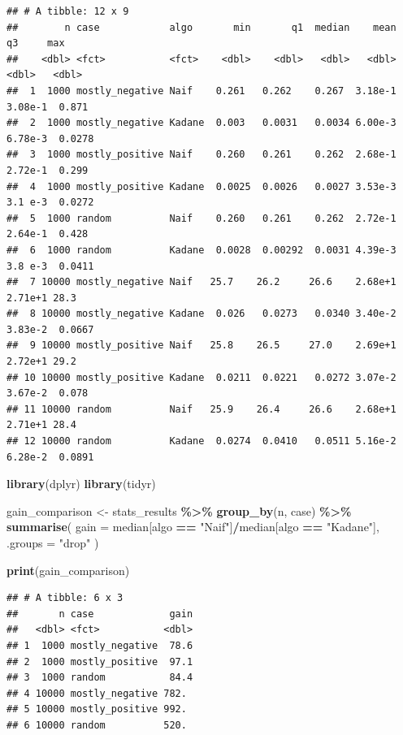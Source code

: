 \documentclass[
]{article}
\newenvironment{Shaded}{\begin{snugshade}}{\end{snugshade}}
\newcommand{\AttributeTok}[1]{\textcolor[rgb]{0.13,0.29,0.53}{#1}}
\newcommand{\FunctionTok}[1]{\textcolor[rgb]{0.13,0.29,0.53}{\textbf{#1}}}
\newcommand{\NormalTok}[1]{#1}
\newcommand{\OtherTok}[1]{\textcolor[rgb]{0.56,0.35,0.01}{#1}}
\newcommand{\SpecialCharTok}[1]{\textcolor[rgb]{0.81,0.36,0.00}{\textbf{#1}}}
\newcommand{\StringTok}[1]{\textcolor[rgb]{0.31,0.60,0.02}{#1}}
\begin{document}
\begin{verbatim}
## # A tibble: 12 x 9
##        n case            algo       min       q1  median    mean      q3     max
##    <dbl> <fct>           <fct>    <dbl>    <dbl>   <dbl>   <dbl>   <dbl>   <dbl>
##  1  1000 mostly_negative Naif    0.261   0.262    0.267  3.18e-1 3.08e-1  0.871 
##  2  1000 mostly_negative Kadane  0.003   0.0031   0.0034 6.00e-3 6.78e-3  0.0278
##  3  1000 mostly_positive Naif    0.260   0.261    0.262  2.68e-1 2.72e-1  0.299 
##  4  1000 mostly_positive Kadane  0.0025  0.0026   0.0027 3.53e-3 3.1 e-3  0.0272
##  5  1000 random          Naif    0.260   0.261    0.262  2.72e-1 2.64e-1  0.428 
##  6  1000 random          Kadane  0.0028  0.00292  0.0031 4.39e-3 3.8 e-3  0.0411
##  7 10000 mostly_negative Naif   25.7    26.2     26.6    2.68e+1 2.71e+1 28.3   
##  8 10000 mostly_negative Kadane  0.026   0.0273   0.0340 3.40e-2 3.83e-2  0.0667
##  9 10000 mostly_positive Naif   25.8    26.5     27.0    2.69e+1 2.72e+1 29.2   
## 10 10000 mostly_positive Kadane  0.0211  0.0221   0.0272 3.07e-2 3.67e-2  0.078 
## 11 10000 random          Naif   25.9    26.4     26.6    2.68e+1 2.71e+1 28.4   
## 12 10000 random          Kadane  0.0274  0.0410   0.0511 5.16e-2 6.28e-2  0.0891
\end{verbatim}

\begin{Shaded}
\begin{Highlighting}[]
\FunctionTok{library}\NormalTok{(dplyr)}
\FunctionTok{library}\NormalTok{(tidyr)}

\NormalTok{gain\_comparison }\OtherTok{\textless{}{-}}\NormalTok{ stats\_results }\SpecialCharTok{\%\textgreater{}\%}
  \FunctionTok{group\_by}\NormalTok{(n, case) }\SpecialCharTok{\%\textgreater{}\%}
  \FunctionTok{summarise}\NormalTok{(}
    \AttributeTok{gain =}\NormalTok{ median[algo }\SpecialCharTok{==} \StringTok{"Naif"}\NormalTok{]}\SpecialCharTok{/}\NormalTok{median[algo }\SpecialCharTok{==} \StringTok{"Kadane"}\NormalTok{],}
    \AttributeTok{.groups =} \StringTok{"drop"}
\NormalTok{  )}

\FunctionTok{print}\NormalTok{(gain\_comparison)}
\end{Highlighting}
\end{Shaded}

\begin{verbatim}
## # A tibble: 6 x 3
##       n case             gain
##   <dbl> <fct>           <dbl>
## 1  1000 mostly_negative  78.6
## 2  1000 mostly_positive  97.1
## 3  1000 random           84.4
## 4 10000 mostly_negative 782. 
## 5 10000 mostly_positive 992. 
## 6 10000 random          520.
\end{verbatim}
\end{document}
